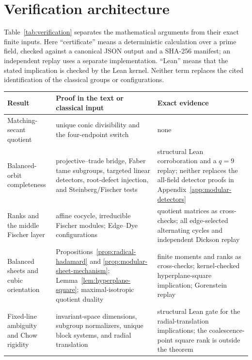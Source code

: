 \documentclass[11pt]{article}
\theoremstyle{definition}
\theoremstyle{remark}
\begin{document}
\section{Verification architecture}
\label{sec:verification}

Table~\ref{tab:verification} separates the mathematical arguments from
their exact finite inputs.  Here ``certificate'' means a deterministic
calculation over a prime field, checked against a canonical JSON output
and a SHA-256 manifest; an independent replay uses a separate
implementation.  ``Lean'' means that the stated implication is
checked by the Lean kernel.  Neither term replaces the cited
identification of the classical groups or configurations.

\begin{table}[ht]
\centering
\footnotesize
\begin{tabular}{@{}>{\raggedright\arraybackslash}p{}
                    >{\raggedright\arraybackslash}p{}
                    >{\raggedright\arraybackslash}p{}@{}}
\toprule
Result & Proof in the text or classical input & Exact evidence \\
\midrule
Matching-secant quotient
& unique conic divisibility and the four-endpoint switch
& none \\
Balanced-orbit completeness
& projective--trade bridge, Faber tame subgroups, targeted linear
  detectors, root-defect injection, and Steinberg/Fischer tests
& structural Lean corroboration and a \(q=9\) replay; neither replaces the
  all-field detector proofs in Appendix~\ref{app:modular-detectors} \\
Ranks and the middle Fischer layer
& affine cocycle, irreducible Fischer modules; Edge--Dye configurations
& quotient matrices as cross-checks; all edge-selected alternating cycles
  and independent Dickson replay \\
Balanced sheets and cubic orientation
& Propositions~\ref{prop:radical-hadamard} and
  \ref{prop:modular-sheet-mechanism};
  Lemma~\ref{lem:hyperplane-square}; maximal-isotropic quotient duality
& finite moments and ranks as cross-checks; kernel-checked
  hyperplane-square implication; Gorenstein replay \\
Fixed-line ambiguity and Chow rigidity
& invariant-space dimensions, subgroup normalizers, unique block systems,
  and radial translation
& structural Lean gate for the radial-translation implications; the
  coalescence-point square rank is outside the theorem \\

\end{tabular}
\end{table}
\end{document}
